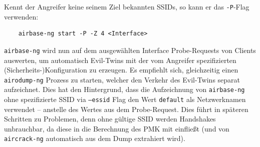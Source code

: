 Kennt der Angreifer keine seinem Ziel bekannten SSIDs, so kann er das \texttt{-P}-Flag verwenden:
\begin{Verbatim}
	airbase-ng start -P -Z 4 <Interface>
\end{Verbatim}

\texttt{airbase-ng} wird nun auf dem ausgewählten Interface Probe-Requests von Clients auswerten, um automatisch Evil-Twins mit der vom Angreifer spezifizierten (Sicherheits-)Konfiguration zu erzeugen.
Es empfiehlt sich, gleichzeitig einen \texttt{airodump-ng} Prozess zu starten, welcher den Verkehr des Evil-Twins separat aufzeichnet.
Dies hat den Hintergrund, dass die Aufzeichnung von \texttt{airbase-ng} ohne spezifizierte SSID via \texttt{--essid} Flag den Wert \texttt{default} als Netzwerknamen verwendet -- anstelle des Wertes aus dem Probe-Request. Dies führt in späteren Schritten zu Problemen, denn ohne gültige SSID werden Handshakes unbrauchbar, da diese in die Berechnung des PMK mit einfließt (und von \texttt{aircrack-ng} automatisch aus dem Dump extrahiert wird).

